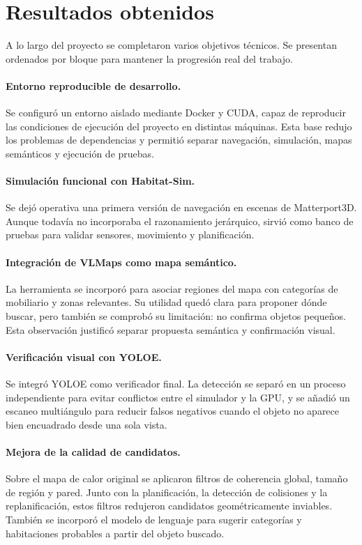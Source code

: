 \documentclass[11pt,fleqn,openany]{book} %
\begin{document}
\section{Resultados obtenidos}

A lo largo del proyecto se completaron varios objetivos técnicos. Se presentan ordenados por bloque para mantener la progresión real del trabajo.

\paragraph{Entorno reproducible de desarrollo.} Se configuró un entorno aislado mediante Docker y CUDA, capaz de reproducir las condiciones de ejecución del proyecto en distintas máquinas. Esta base redujo los problemas de dependencias y permitió separar navegación, simulación, mapas semánticos y ejecución de pruebas.

\paragraph{Simulación funcional con Habitat-Sim.} Se dejó operativa una primera versión de navegación en escenas de Matterport3D. Aunque todavía no incorporaba el razonamiento jerárquico, sirvió como banco de pruebas para validar sensores, movimiento y planificación.

\paragraph{Integración de VLMaps como mapa semántico.} La herramienta se incorporó para asociar regiones del mapa con categorías de mobiliario y zonas relevantes. Su utilidad quedó clara para proponer dónde buscar, pero también se comprobó su limitación: no confirma objetos pequeños. Esta observación justificó separar propuesta semántica y confirmación visual.

\paragraph{Verificación visual con YOLOE.} Se integró YOLOE como verificador final. La detección se separó en un proceso independiente para evitar conflictos entre el simulador y la GPU, y se añadió un escaneo multiángulo para reducir falsos negativos cuando el objeto no aparece bien encuadrado desde una sola vista.

\paragraph{Mejora de la calidad de candidatos.} Sobre el mapa de calor original se aplicaron filtros de coherencia global, tamaño de región y pared. Junto con la planificación, la detección de colisiones y la replanificación, estos filtros redujeron candidatos geométricamente inviables. También se incorporó el modelo de lenguaje para sugerir categorías y habitaciones probables a partir del objeto buscado.
\end{document}
